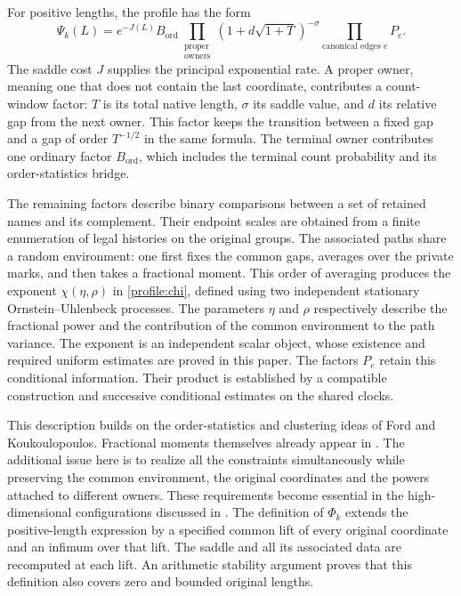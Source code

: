 For positive lengths, the profile has the form
\[
 \Psi_k(L)=e^{-J(L)}B_{\mathrm{ord}}
 \prod_{\substack{\text{proper}\\\text{owners}}}
       (1+d\sqrt{1+T})^{-\sigma}
 \prod_{\text{canonical edges }e}P_e.
\]
The saddle cost $J$ supplies the principal exponential rate. A proper
owner, meaning one that does not contain the last coordinate, contributes
a count-window factor: $T$ is its total native length, $\sigma$ its
saddle value, and $d$ its relative gap from the next owner. This factor
keeps the transition between a fixed gap and a gap of order $T^{-1/2}$
in the same formula. The terminal owner contributes one ordinary factor
$B_{\mathrm{ord}}$, which includes the terminal count probability and
its order-statistics bridge.

The remaining factors describe binary comparisons between a set of
retained names and its complement. Their endpoint scales are obtained
from a finite enumeration of legal histories on the original groups.
The associated paths share a random environment: one first fixes the
common gaps, averages over the private marks, and then takes a
fractional moment. This order of averaging produces the exponent
$\chi(\eta,\rho)$ in \eqref{profile:chi}, defined using two independent
stationary Ornstein--Uhlenbeck processes. The parameters $\eta$ and
$\rho$ respectively describe the fractional power and the contribution
of the common environment to the path variance. The exponent is an
independent scalar object, whose existence and required uniform
estimates are proved in this paper. The factors $P_e$ retain this
conditional information. Their product is established by a compatible
construction and successive conditional estimates on the shared clocks.

This description builds on the order-statistics and clustering ideas
of Ford and Koukoulopoulos. Fractional moments themselves already
appear in \cite[Section~1]{KoukLocal}. The additional issue here is to
realize all the constraints simultaneously while preserving the common
environment, the original coordinates and the powers attached to
different owners. These requirements become essential in the
high-dimensional configurations discussed in \cite[Section~2.2]{Kouk}.
The definition of $\Phi_k$ extends the positive-length expression by a
specified common lift of every original coordinate and an infimum over
that lift. The saddle and all its associated data are recomputed at each
lift. An arithmetic stability argument proves that this definition also
covers zero and bounded original lengths.

